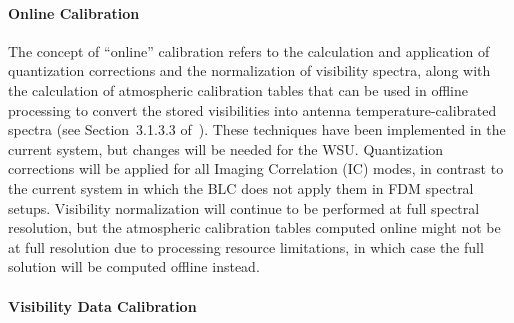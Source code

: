 \paragraph{Online Calibration}

The concept of ``online'' calibration refers to the calculation and application of quantization corrections and the normalization of visibility spectra, along with the calculation of atmospheric calibration tables that can be used in offline processing to convert the stored visibilities into antenna temperature-calibrated spectra (see Section~3.1.3.3 of~\cite{CSA-IA}).   
These techniques have been implemented in the current system, but changes will be needed for the WSU.
Quantization corrections will
be applied for all Imaging Correlation (IC) modes, in contrast to the current system in which the BLC does not apply them in FDM spectral setups.  Visibility normalization will continue to be performed at full spectral resolution, but the atmospheric calibration tables computed online might not be at full resolution due to 
processing resource limitations, in which case the full solution will be computed offline instead.

\paragraph{Visibility Data Calibration}

